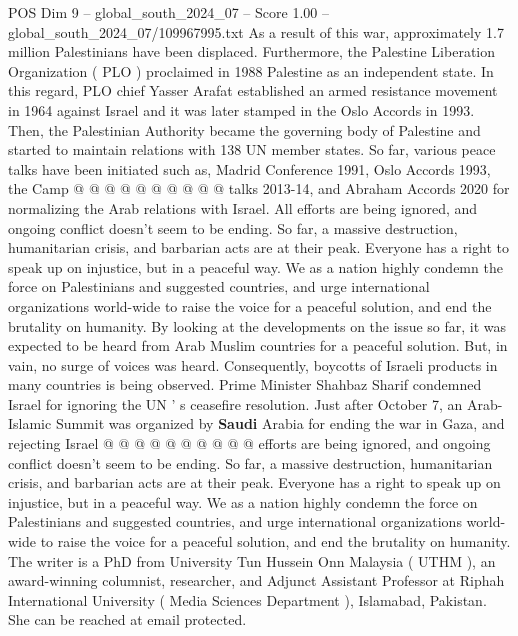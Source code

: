 \begin{textsample}{POS Dim 9 – global\_south\_2024\_07 – Score 1.00 – global\_south\_2024\_07/109967995.txt}
As a result of this war, approximately 1.7 million Palestinians have been displaced.
Furthermore, the Palestine Liberation Organization ( PLO ) proclaimed in 1988 Palestine as an independent state.
In this regard, PLO chief Yasser Arafat established an armed resistance movement in 1964 against Israel and it was later stamped in the Oslo Accords in 1993.
Then, the Palestinian Authority became the governing body of Palestine and started to maintain relations with 138 UN member states.
So far, various peace talks have been initiated such as, Madrid Conference 1991, Oslo Accords 1993, the Camp @ @ @ @ @ @ @ @ @ @ talks 2013-14, and Abraham Accords 2020 for normalizing the Arab relations with Israel.
All efforts are being ignored, and ongoing conflict doesn't seem to be ending.
So far, a massive destruction, humanitarian crisis, and barbarian acts are at their peak.
Everyone has a right to speak up on injustice, but in a peaceful way.
We as a nation highly condemn the force on Palestinians and suggested countries, and urge international organizations world-wide to raise the voice for a peaceful solution, and end the brutality on humanity.
By looking at the developments on the issue so far, it was expected to be heard from Arab Muslim countries for a peaceful solution.
But, in vain, no surge of voices was heard.
Consequently, boycotts of Israeli products in many countries is being observed.
Prime Minister Shahbaz Sharif condemned Israel for ignoring the UN ' s ceasefire resolution.
Just after October 7, an Arab-Islamic Summit was organized by \textbf{Saudi} Arabia for ending the war in Gaza, and rejecting Israel @ @ @ @ @ @ @ @ @ @ efforts are being ignored, and ongoing conflict doesn't seem to be ending.
So far, a massive destruction, humanitarian crisis, and barbarian acts are at their peak.
Everyone has a right to speak up on injustice, but in a peaceful way.
We as a nation highly condemn the force on Palestinians and suggested countries, and urge international organizations world-wide to raise the voice for a peaceful solution, and end the brutality on humanity.
The writer is a PhD from University Tun Hussein Onn Malaysia ( UTHM ), an award-winning columnist, researcher, and Adjunct Assistant Professor at Riphah International University ( Media Sciences Department ), Islamabad, Pakistan.
She can be reached at email protected.

\end{textsample}
